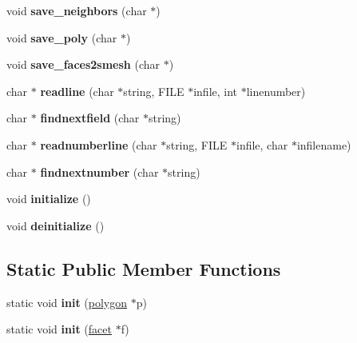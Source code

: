 \begin{DoxyCompactItemize}
void {\bfseries save\+\_\+neighbors} (char $\ast$)
\item 
\mbox{\label{classtetgenio_ac512604429e7c754f3128a94133babdd}} 
void {\bfseries save\+\_\+poly} (char $\ast$)
\item 
\mbox{\label{classtetgenio_a5f74cc6e1f7264c70049cde809b083e2}} 
void {\bfseries save\+\_\+faces2smesh} (char $\ast$)
\item 
\mbox{\label{classtetgenio_a085af1b2c889a6545f6aab67aad1ba43}} 
char $\ast$ {\bfseries readline} (char $\ast$string, F\+I\+LE $\ast$infile, int $\ast$linenumber)
\item 
\mbox{\label{classtetgenio_ad181a411db5dbcb1e11af7641e268bd5}} 
char $\ast$ {\bfseries findnextfield} (char $\ast$string)
\item 
\mbox{\label{classtetgenio_a5e59fa66b5f0f4a7b7aa72df554ac1c7}} 
char $\ast$ {\bfseries readnumberline} (char $\ast$string, F\+I\+LE $\ast$infile, char $\ast$infilename)
\item 
\mbox{\label{classtetgenio_a9a30e99d63fb2288525cdbda2b887c38}} 
char $\ast$ {\bfseries findnextnumber} (char $\ast$string)
\item 
\mbox{\label{classtetgenio_ac164a365a6a479bb31cd40443f5bd989}} 
void {\bfseries initialize} ()
\item 
\mbox{\label{classtetgenio_afcc5a8855570b36717070f3f47e3ef2a}} 
void {\bfseries deinitialize} ()
\end{DoxyCompactItemize}
\subsection*{Static Public Member Functions}
\begin{DoxyCompactItemize}
\item 
\mbox{\label{classtetgenio_aca2fd0dcb29ee3cd313a74d55df2ff2c}} 
static void {\bfseries init} (\hyperlink{structtetgenio_1_1polygon}{polygon} $\ast$p)
\item 
\mbox{\label{classtetgenio_a54b1b29c83d5c6e1466bbb087fe1f80e}} 
static void {\bfseries init} (\hyperlink{structtetgenio_1_1facet}{facet} $\ast$f)
\end{DoxyCompactItemize}
